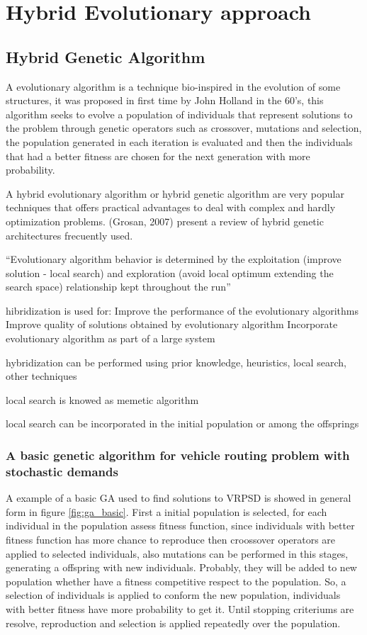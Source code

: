 \chapter{Hybrid Evolutionary approach}
\label{chap:methodology}



\section{Hybrid Genetic Algorithm}

A evolutionary algorithm is a technique bio-inspired in the evolution of some structures, it was proposed in first time by John Holland in the 60's, this algorithm seeks to evolve a population of individuals that represent solutions to the problem through genetic operators such as crossover, mutations and selection, the population generated in each iteration is evaluated and then the individuals that had a better fitness are chosen for the next generation with more probability.

A hybrid evolutionary algorithm or hybrid genetic algorithm are very popular techniques that offers practical advantages to deal with complex and hardly optimization problems. (Grosan, 2007) present a review of hybrid genetic architectures frecuently used.

``Evolutionary algorithm behavior is determined by the exploitation (improve solution - local search) and exploration (avoid local optimum extending the search space) relationship kept throughout the run''

hibridization is used for:
Improve the performance of the evolutionary algorithms
Improve quality of solutions obtained by evolutionary algorithm
Incorporate evolutionary algorithm as part of a large system

hybridization can be performed using prior knowledge, heuristics, local search, other techniques

local search is knowed as memetic algorithm

local search can be incorporated in the initial population or among the offsprings

\subsection{A basic genetic algorithm for vehicle routing problem with stochastic demands}

A example of a basic GA used to find solutions to VRPSD is showed in general form in figure \ref{fig:ga_basic}. First a initial population is selected, for each individual in the population assess fitness function, since individuals with better fitness function has more chance to reproduce then croossover operators are applied to selected individuals, also mutations can be performed in this stages, generating a offspring with new individuals. Probably, they will be added to new population whether have a fitness competitive respect to the population. So, a selection of individuals is applied to conform the new population, individuals with better fitness have more probability to get it. Until stopping criteriums are resolve, reproduction and selection is applied repeatedly over the population.

